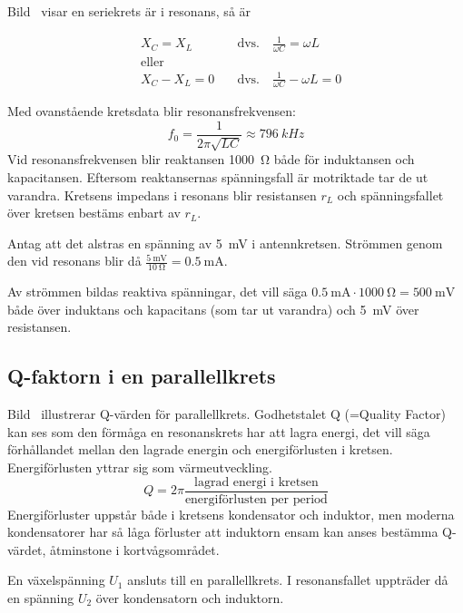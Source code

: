 Bild~ visar en seriekrets är i resonans, så är

\begin{align*}
& X_C = X_L \quad & \text{dvs.} \quad \frac{1}{\omega C} = \omega L\\
& \text{eller} & \\
& X_C - X_L = 0 \quad & \text{dvs.} \quad \frac{1}{\omega C} - \omega L = 0
\end{align*}

Med ovanstående kretsdata blir resonansfrekvensen:
%
\[
f_0 = \frac{1}{2\pi \sqrt{LC}} \approx 796\ kHz
\]
%
Vid resonansfrekvensen blir reaktansen \qty{1000}{\ohm} både för induktansen och
kapacitansen.
Eftersom reaktansernas spänningsfall är motriktade tar de ut varandra.
Kretsens impedans i resonans blir resistansen \(r_L\) och
spänningsfallet över kretsen bestäms enbart av \(r_L\).

Antag att det alstras en spänning av \qty{5}{\milli\volt} i antennkretsen.
Strömmen genom den vid resonans blir då
\(\frac{\qty{5}{\milli\volt}}{\qty{10}{\ohm}} = \qty{0,5}{\milli\ampere}\).

Av strömmen bildas reaktiva spänningar, det vill säga \(\qty{0,5}{\milli\ampere}
\cdot \qty{1000}{\ohm} = \qty{500}{\milli\volt}\) både över induktans och
kapacitans (som tar ut varandra) och \qty{5}{\milli\volt} över resistansen.

\subsection{Q-faktorn i en parallellkrets}
\label{Q-faktor}


Bild~ illustrerar Q-värden för parallellkrets.
Godhetstalet Q (=Quality Factor) kan ses som den förmåga en resonanskrets har
att lagra energi, det vill säga förhållandet mellan den lagrade energin och
energiförlusten i kretsen.
Energiförlusten yttrar sig som värmeutveckling.
%
\[
Q = 2\pi \frac{\text{lagrad energi i kretsen}}{\text{energiförlusten per period}}
\]
%
Energiförluster uppstår både i kretsens kondensator och induktor, men moderna
kondensatorer har så låga förluster att induktorn ensam kan anses bestämma
Q-värdet, åtminstone i kortvågsområdet.

En växelspänning \(U_1\) ansluts till en parallellkrets.
I resonansfallet uppträder då en spänning \(U_2\) över kondensatorn och
induktorn.

